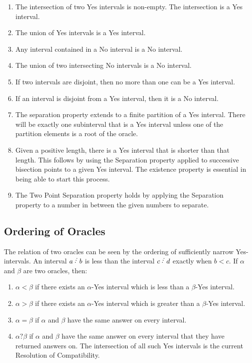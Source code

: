 \documentclass[12pt]{article}
\begin{document}
\begin{enumerate}
    \item The intersection of two Yes intervals is non-empty. The intersection is a Yes interval. 
    \item The union of Yes intervals is a Yes interval. 
    \item Any interval contained in a No interval is a No interval. 
    \item The union of two intersecting No intervals is a No interval. 
    \item If two intervals are disjoint, then no more than one can be a Yes interval. 
    \item If an interval is disjoint from a Yes interval, then it is a No interval. 
    \item The separation property extends to a finite partition of a Yes interval. There will be exactly one subinterval that is a Yes interval unless one of the partition elements is a root of the oracle.   
    \item Given a positive length, there is a Yes interval that is shorter than that length. This follows by using the Separation property applied to successive bisection points to a given Yes interval.  The existence property is essential in being able to start this process.
    \item The Two Point Separation property holds by applying the Separation property to a number in between the given numbers to separate. 
\end{enumerate}

\subsection{Ordering of Oracles}

The relation of two oracles can be seen by the ordering of sufficiently narrow Yes-intervals. An interval $a\lte b$ is less than the interval $c\lte d$ exactly when $b < c$. If  $\alpha$ and  $\beta$ are two oracles, then:
\begin{enumerate}
\item $\alpha<\beta$ if there exists an  $\alpha$-Yes interval which is less than a  $\beta$-Yes interval.
\item $\alpha>\beta$ if there exists an  $\alpha$-Yes interval which is greater than a  $\beta$-Yes interval.
\item $\alpha=\beta$ if  $\alpha$ and  $\beta$ have the same answer on every interval.
\item $\alpha?\beta$ if  $\alpha$ and  $\beta$ have the same answer on every interval that they have returned answers on. The intersection of all such Yes intervals is the current Resolution of Compatibility. 
\end{enumerate}
\end{document}
